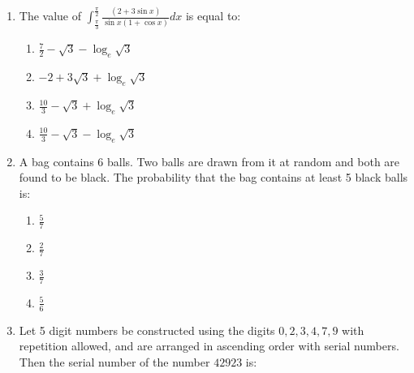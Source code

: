 \documentclass[journal]{IEEEtran}
\newcommand{\brak}[1]{\left( #1 \right)}
\begin{document}
\begin{enumerate}
      S2: $\brak{\brak{\neg p}\Rightarrow\brak{\neg q}}\land\brak{\brak{\neg p}\lor q}$ is a contradiction. Then
    
        \begin{multicols}{4}
        \begin{enumerate}
        \item only $\brak{S2}$ is correct
        \item both $\brak{S1}$ and $\brak{S2}$ are correct
        \item both $\brak{S1}$ and $\brak{S2}$ are wrong
        \item only $\brak{S1}$ is correct
        \end{enumerate}
        \end{multicols}
    
    \item The value of $\int_{\frac{\pi}{3}}^{\frac{\pi}{2}}\frac{\brak{2+3\sin{x}}}{\sin{x}\brak{1+\cos{x}}}dx$ is equal to:

        \begin{enumerate}
        \item $\frac{7}{2}-\sqrt{3}-\log_{e}\sqrt{3}$
        \item $-2+3\sqrt{3}+\log_{e}\sqrt{3}$
        \item $\frac{10}{3}-\sqrt{3}+\log_{e}\sqrt{3}$
        \item $\frac{10}{3}-\sqrt{3}-\log_{e}\sqrt{3}$
        \end{enumerate}

    \item A bag contains 6 balls. Two balls are drawn from it at random and both are found to be black. The probability that the bag contains at least 5 black balls is:

        \begin{multicols}{4}
        \begin{enumerate}
        \item $\frac{5}{7}$
        \item $\frac{2}{7}$
        \item $\frac{3}{7}$
        \item $\frac{5}{6}$
        \end{enumerate}
        \end{multicols}

    \item Let 5 digit numbers be constructed using the digits $0, 2, 3, 4, 7, 9$ with repetition allowed, and are arranged in ascending order with serial numbers. Then the serial number of the number $42923$ is:


\end{enumerate}
\end{document}
